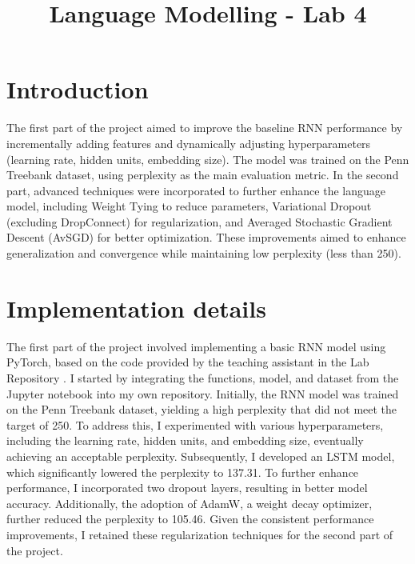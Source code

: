 \documentclass[a4paper]{article}
\title{Language Modelling - Lab 4}
\begin{document}
\maketitle
%
%
\section{Introduction}
The first part of the project aimed to improve the baseline RNN performance by incrementally adding 
features and dynamically adjusting hyperparameters (learning rate, hidden units,
embedding size). The model was trained on the Penn Treebank dataset, using perplexity
as the main evaluation metric. In the second part, advanced techniques \cite{merityRegOpt} were 
incorporated to further enhance the language model, including Weight Tying 
to reduce parameters, Variational Dropout (excluding DropConnect) for 
regularization, and Averaged Stochastic Gradient Descent (AvSGD) for better
optimization. These improvements aimed to enhance generalization and 
convergence while maintaining low perplexity (less than 250). 

\section{Implementation details}

The first part of the project involved implementing a basic RNN model using PyTorch, 
based on the code provided by the teaching assistant in the Lab Repository \cite{nlu-labs-unitn}.
 I started by integrating the functions, model, and dataset from the Jupyter notebook into my own 
 repository. Initially, the RNN model was trained on the Penn Treebank dataset, yielding a high 
 perplexity that did not meet the target of 250. To address this, I experimented with various 
 hyperparameters, including the learning rate, hidden units, and embedding size, eventually 
 achieving an acceptable perplexity. Subsequently, I developed an LSTM model, which significantly 
 lowered the perplexity to 137.31. To further enhance performance, I incorporated two dropout layers,
  resulting in better model accuracy. Additionally, the adoption of AdamW, a weight decay optimizer, 
  further reduced the perplexity to 105.46. Given the consistent performance improvements, I retained
   these regularization techniques for the second part of the project.
\end{document}
